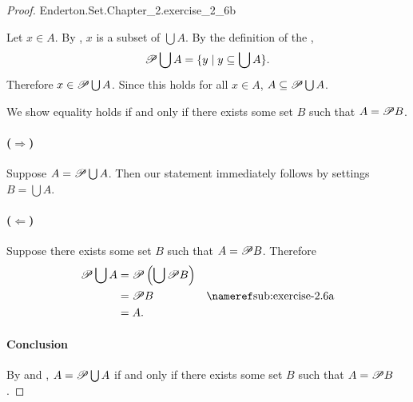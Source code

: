 \documentclass{report}
\begin{document}
\begin{proof}

    {Enderton.Set.Chapter\_2.exercise\_2\_6b}

  Let $x \in A$.
  By , $x$ is a subset of $\bigcup A$.
  By the definition of the ,
    $$\mathscr{P}\bigcup A = \{ y \mid y \subseteq \bigcup A \}.$$
  Therefore $x \in \mathscr{P}\bigcup A$.
  Since this holds for all $x \in A$, $A \subseteq \mathscr{P}\bigcup A$.

  \suitdivider

  We show equality holds if and only if there exists some set $B$ such that
    $A = \mathscr{P}B$.

  \paragraph{($\Rightarrow$)}%
  \label{par:exercise-2.6b-right}

    Suppose $A = \mathscr{P}\bigcup A$.
    Then our statement immediately follows by settings $B = \bigcup A$.

  \paragraph{($\Leftarrow$)}%
  \label{par:exercise-2.6b-left}

    Suppose there exists some set $B$ such that $A = \mathscr{P}B$.
    Therefore
      \begin{align*}
        \powerset{\bigcup A}
          & = \powerset{\left(\bigcup {\powerset {B}}\right)} \\
          & = \powerset{B} & \textref{sub:exercise-2.6a} \\
          & = A.
      \end{align*}

  \paragraph{Conclusion}%

    By  and ,
      $A = \mathscr{P}\bigcup A$ if and only if there exists some set $B$ such
      that $A = \mathscr{P}B$.

\end{proof}

\subsection{}%
\label{sub:exercise-2.7a}
\end{document}
